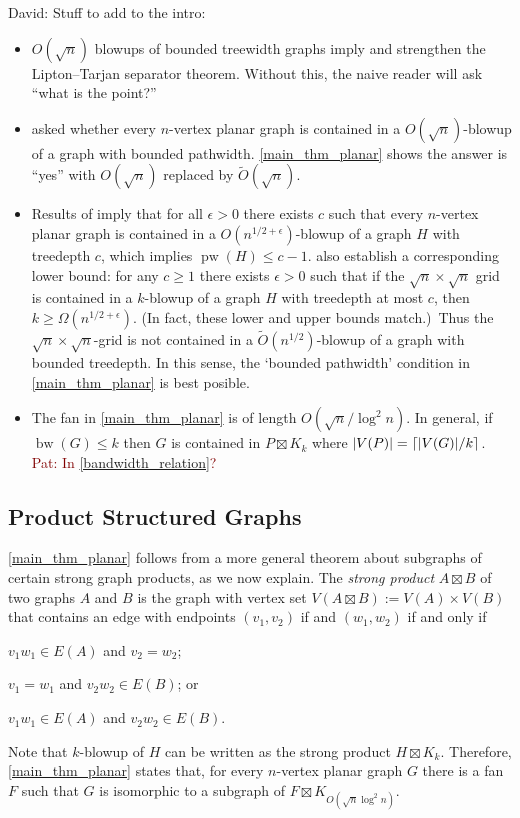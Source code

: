 \documentclass{patmorin}
\renewcommand{\geq}{\geqslant}
\renewcommand{\leq}{\leqslant}
\newcommand{\david}[1]{{\color{orange} David: #1}}
\newcommand{\pat}[1]{\textcolor{Maroon}{Pat: #1}}
\newcommand{\defin}[1]{\emph{\textcolor{brightmaroon}{#1}}}
\DeclareMathOperator{\pw}{pw}
\DeclareMathOperator{\bw}{bw}
\begin{document}
\david{Stuff to add to the intro:
\begin{itemize}
\item $O(\sqrt{n})$ blowups of bounded treewidth graphs imply and strengthen the Lipton--Tarjan separator theorem. Without this, the naive reader will ask ``what is the point?''
\item \citet{distel.dujmovic.ea:product} asked whether every $n$-vertex planar graph is contained in a $O(\sqrt{n})$-blowup of a graph with bounded pathwidth. \cref{main_thm_planar} shows the answer is ``yes'' with $O(\sqrt{n})$ replaced by $\tilde{O}(\sqrt{n})$.
\item Results of \citet[Theorem~5]{DvoWoo} imply that for all $\epsilon>0$ there exists $c$ such that every $n$-vertex planar graph is contained in a $O(n^{1/2+\epsilon})$-blowup of a graph $H$ with treedepth $c$, which implies $\pw(H)\leq c-1$. \citet[Theorem~19]{DvoWoo} also establish a corresponding lower bound: for any $c\geq 1$ there exists $\epsilon>0$ such that if the $\sqrt{n}\times\sqrt{n}$ grid is contained in a $k$-blowup of a graph $H$ with treedepth at most $c$, then $k\geq\Omega(n^{1/2+\epsilon})$. (In fact, these lower and upper bounds match.)\ Thus the $\sqrt{n}\times \sqrt{n}$-grid is not contained in a $\tilde{O}(n^{1/2})$-blowup of a graph with bounded treedepth. In this sense, the `bounded pathwidth' condition in \cref{main_thm_planar} is best posible.
\item The fan in \cref{main_thm_planar} is of length $O(\sqrt{n}/\log^2 n)$. In general, if $\bw(G)\leq k$ then $G$ is contained in $P\boxtimes K_k$ where $|V(P)|={\lceil |V(G)|/k \rceil}$. \pat{In \cref{bandwidth_relation}?}
\end{itemize}}


\subsection{Product Structured Graphs}

\cref{main_thm_planar} follows from a more general theorem about subgraphs of certain strong graph products, as we now explain.  The \defin{strong product} $A\boxtimes B$ of two graphs $A$ and $B$ is the graph with vertex set $V(A\boxtimes B):=V(A)\times V(B)$ that contains an edge with endpoints $(v_1,v_2)$ if and $(w_1,w_2)$ if and only if
\begin{compactenum}
    \item $v_1w_1\in E(A)$ and $v_2=w_2$;
    \item $v_1=w_1$ and $v_2w_2\in E(B)$; or
    \item $v_1w_1\in E(A)$ and $v_2w_2\in E(B)$.
\end{compactenum}
Note that $k$-blowup of $H$ can be written as the strong product $H\boxtimes K_k$.  Therefore, \cref{main_thm_planar} states that, for every $n$-vertex planar graph $G$ there is a fan $F$ such that $G$ is isomorphic to a subgraph of $F\boxtimes K_{O(\sqrt{n}\log^2 n)}$.
\end{document}
